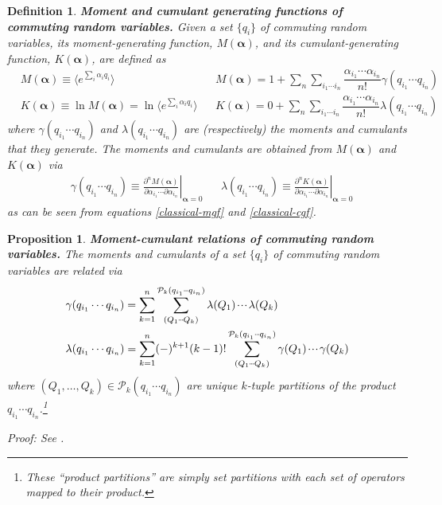 \documentclass[11pt,fleqn]{article}
\renewcommand{\a}{\alpha}    %
\newcommand{\g}{\gamma}      %
\newcommand{\la}{\lambda}    %
\newcommand{\ld}{\ensuremath{\ldots}}
\newcommand{\cd}{\ensuremath{\cdots}}
\newcommand{\etc}{\ensuremath{\mathinner{\mkern-1mu\cdotp\mkern-2mu\cdotp\mkern-2mu\cdotp\mkern-1mu}}}
\newcommand{\bmit}[1]{{\bfseries\itshape\mathversion{bold}#1}}
\newcommand{\mc}[1]{\ensuremath{\mathcal{#1}}}
\newcommand{\fr}[2]{\ensuremath{\dfrac{#1}{#2}}}
\newcommand{\pd}[2]{\ensuremath{\frac{\partial#1}{\partial#2}}}
\newcommand{\pt}{\ensuremath{\partial}}
\newcommand{\ip}[1]{\ensuremath{\langle#1\rangle}}
\theoremstyle{mystyle}
\newtheorem{dfn}{Definition}[section]
\newtheorem{pro}{Proposition}[section]
\numberwithin{equation}{section}
\begin{document}
\begin{dfn}
\bmit{Moment and cumulant generating functions of commuting random variables.}
Given a set $\{q_i\}$ of commuting random variables, its \textit{moment-generating function}, $M(\bm\a)$, and its \textit{cumulant-generating function}, $K(\bm\a)$, are defined as
\begin{align}
\label{classical-mgf}
&
  M(\bm\a)
\equiv
  \ip{e^{\sum_i\a_i q_i}}
&&
  M(\bm\a)
=
  1
+
  \sum_n
  \sum_{i_1\cd i_n}
  \fr{\a_{i_1}\cd \a_{i_n}}{n!}
  \g(q_{i_1}\cd q_{i_n})
\\
\label{classical-cgf}
&
  K(\bm\a)
\equiv
  \ln M(\bm\a)
=
  \ln \ip{e^{\sum_i\a_i q_i}}
&&
  K(\bm\a)
=
  0
+
  \sum_n
  \sum_{i_1\cd i_n}
  \fr{\a_{i_1}\cd \a_{i_n}}{n!}
  \la(q_{i_1}\cd q_{i_n})
\end{align}
where $\g(q_{i_1}\cd q_{i_n})$ and $\la(q_{i_1}\cd q_{i_n})$ are (respectively) the \textit{moments} and \textit{cumulants} that they generate.
The moments and cumulants are obtained from $M(\bm\a)$ and $K(\bm\a)$ via
\begin{align}
&
  \g(q_{i_1}\cd q_{i_n})
\equiv
  \left.
  \pd{^n M(\bm\a)}{\a_{i_1}\cd\pt\a_{i_n}}
  \right|_{\bm\a=0}
&&
  \la(q_{i_1}\cd q_{i_n})
\equiv
  \left.
  \pd{^n K(\bm\a)}{\a_{i_1}\cd\pt\a_{i_n}}
  \right|_{\bm\a=0}
\end{align}
as can be seen from equations \ref{classical-mgf} and \ref{classical-cgf}.
\end{dfn}

\begin{pro}
\label{moment-cumulant-relations-classical}
\bmit{Moment-cumulant relations of commuting random variables.}
\textit{The moments and cumulants of a set $\{q_i\}$ of commuting random variables are related via
\begin{align}
&
  \g(q_{i_1}\cd q_{i_n})
=
  \sum_{k=1}^n
  \sum_{(Q_1\etc Q_k)}^{\mc{P}_k(q_{i_1}\etc q_{i_n})}
  \la(Q_1)\etc\la(Q_k)
\\
&
  \la(q_{i_1}\cd q_{i_n})
=
  \sum_{k=1}^n
  (-)^{k+1}
  (k-1)!
  \sum_{(Q_1\etc Q_k)}^{\mc{P}_k(q_{i_1}\etc q_{i_n})}
  \g(Q_1)\etc\g(Q_k)
\end{align}
where $(Q_1,\ld,Q_k)\in\mc{P}_k(q_{i_1}\cd q_{i_n})$ are unique $k$-tuple partitions of the product $q_{i_1}\cd q_{i_n}$.}\footnote{These ``product partitions'' are simply set partitions with each set of operators mapped to their product.}
\begin{addmargin}[1em]{0em}
Proof: See .
\end{addmargin}
\end{pro}
\end{document}
